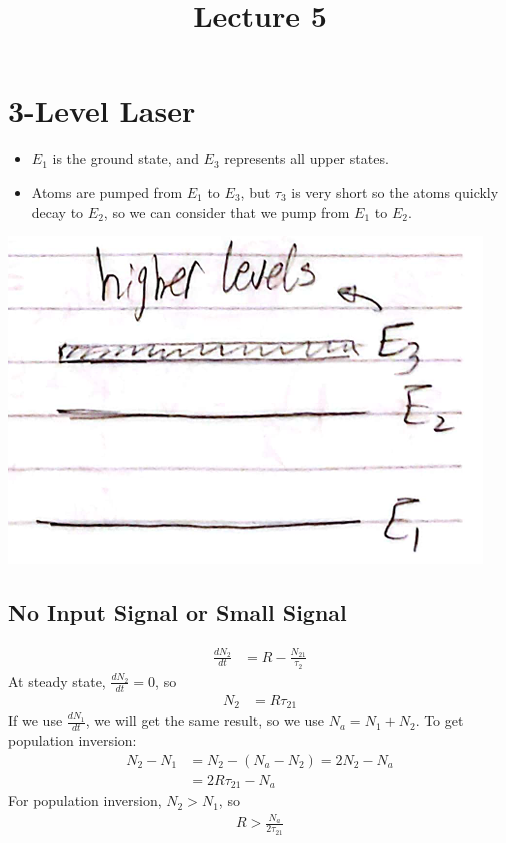 \documentclass[11pt]{article}
\title{Lecture 5}
\author{}
\date{}
\begin{document}
\maketitle

\section{3-Level Laser}
\begin{minipage}{0.5\textwidth}
    \begin{itemize}
        \item $E_1$ is the ground state, and $E_3$ represents all upper states.
        \item Atoms are pumped from $E_1$ to $E_3$, but $\tau_3$ is very short so the atoms quickly decay to $E_2$, so we can consider that we pump from $E_1$ to $E_2$.
    \end{itemize}
\end{minipage}
\begin{minipage}{0.45\textwidth}
    \centering
    \includegraphics[scale=0.6]{1.png}
\end{minipage}
\subsection{No Input Signal or Small Signal}
\begin{align*}
    \frac{dN_2}{dt} &= R - \frac{N_{21}}{\tau_{2}}
\end{align*}
At steady state, $\frac{dN_2}{dt} = 0$, so
\begin{align*}
    N_2 &= R \tau_{21}
\end{align*}
If we use $\frac{dN_1}{dt}$, we will get the same result, so we use $N_a = N_1 + N_2$. To get population inversion:
\begin{align*}
    N_2 - N_1 &= N_2 - (N_a - N_2) = 2N_2 - N_a \\
    &= 2R \tau_{21} - N_a
\end{align*}
For population inversion, $N_2 > N_1$, so
\begin{align*}
    R > \frac{N_a}{2\tau_{21}}
\end{align*}
\end{document}
